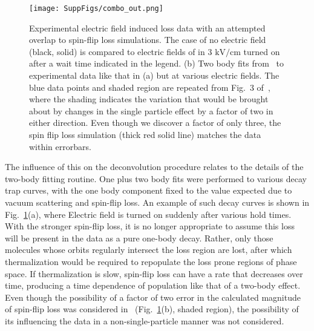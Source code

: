 \documentclass[%
 reprint,
 amsmath,amssymb,
 aps,
pra,
]{revtex4-1}
\begin{document}
\begin{figure} %
\texttt{[image: SuppFigs/combo\_out.png]} 
\caption{Experimental electric field induced loss data with an attempted overlap to spin-flip loss simulations. The case of no electric field (black, solid) is compared to electric fields of in $3\text{ kV/cm}$ turned on after a wait time indicated in the legend. (b) Two body fits from~\cite{Stuhl2013} to experimental data like that in (a) but at various electric fields. The blue data points and shaded region are repeated from Fig.~3 of~\cite{Stuhl2013}, where the shading indicates the variation that would be brought about by changes in the single particle effect by a factor of two in either direction. Even though we discover a factor of only three, the spin flip loss simulation (thick red solid line) matches the data within errorbars.\label{fig:eil}}
\end{figure}

The influence of this on the deconvolution procedure relates to the details of the two-body fitting routine.
One plus two body fits were performed to various decay trap curves, with the one body component fixed to the value expected due to vacuum scattering and spin-flip loss.
An example of  such decay curves is shown in Fig.~\ref{fig:eil}(a), where Electric field is turned on suddenly after various hold times.
With the stronger spin-flip loss, it is no longer appropriate to assume this loss will be present in the data as a pure one-body decay.
Rather, only those molecules whose orbits regularly intersect the loss region are lost, after which thermalization would be required to repopulate the loss prone regions of phase space.
If thermalization is slow, spin-flip loss can have a rate that decreases over time, producing a time dependence of population like that of a two-body effect.
Even though the possibility of a factor of two error in the calculated magnitude of spin-flip loss was considered in~\cite{Stuhl2013} (Fig.~\ref{fig:eil}(b), shaded region), the possibility of its influencing the data in a non-single-particle manner was not considered.
\end{document}
